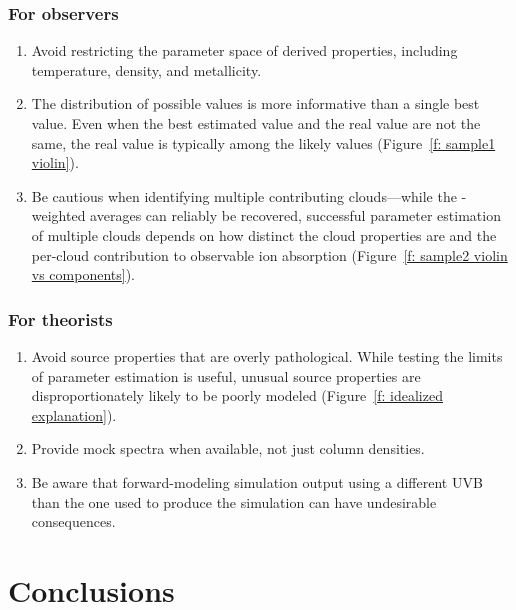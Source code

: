 \documentclass[fleqn,usenatbib]{mnras}
\newcommand{\todo}[1]{\textcolor{Maroon}{\textbf{Address: #1}}}
\begin{document}
\subsubsection{For observers}

\begin{enumerate}
    \item Avoid restricting the parameter space of derived properties, including temperature, density, and metallicity. 
    \item The distribution of possible values is more informative than a single best value. Even when the best estimated value and the real value are not the same, the real value is typically among the likely values (Figure~\ref{f: sample1 violin}).
    \item Be cautious when identifying multiple contributing clouds---while the -weighted averages can reliably be recovered, successful parameter estimation of multiple clouds depends on how distinct the cloud properties are and the per-cloud contribution to observable ion absorption (Figure~\ref{f: sample2 violin vs components}).
\end{enumerate}

\subsubsection{For theorists}

\begin{enumerate}
    \item Avoid source properties that are overly pathological. While testing the limits of  parameter estimation is useful, unusual source properties are disproportionately likely to be poorly modeled (Figure~\ref{f: idealized explanation}).
    \item Provide mock spectra when available, not just column densities.
    \item Be aware that forward-modeling simulation output using a different UVB than the one used to produce the simulation can have undesirable consequences.
\end{enumerate}

\section{Conclusions}
\label{s: conclusions}
\end{document}
